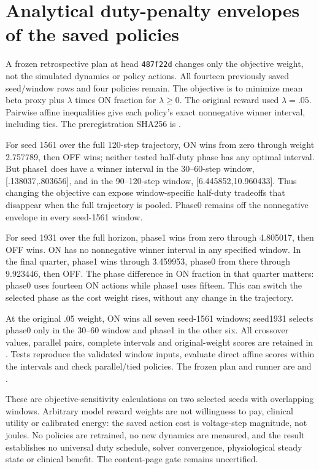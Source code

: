\section{Analytical duty-penalty envelopes of the saved policies}
A frozen retrospective plan at head \texttt{487f22d} changes only the objective weight, not the simulated dynamics or policy actions. All fourteen previously saved seed/window rows and four policies remain. The objective is to minimize mean beta proxy plus $\lambda$ times ON fraction for $\lambda\geq0$. The original reward used $\lambda=.05$. Pairwise affine inequalities give each policy's exact nonnegative winner interval, including ties. The preregistration SHA256 is .

For seed 1561 over the full 120-step trajectory, ON wins from zero through weight 2.757789, then OFF wins; neither tested half-duty phase has any optimal interval. But phase1 does have a winner interval in the 30--60-step window, [.138037,.803656], and in the 90--120-step window, [6.445852,10.960433]. Thus changing the objective can expose window-specific half-duty tradeoffs that disappear when the full trajectory is pooled. Phase0 remains off the nonnegative envelope in every seed-1561 window.

For seed 1931 over the full horizon, phase1 wins from zero through 4.805017, then OFF wins. ON has no nonnegative winner interval in any specified window. In the final quarter, phase1 wins through 3.459953, phase0 from there through 9.923446, then OFF. The phase difference in ON fraction in that quarter matters: phase0 uses fourteen ON actions while phase1 uses fifteen. This can switch the selected phase as the cost weight rises, without any change in the trajectory.

At the original .05 weight, ON wins all seven seed-1561 windows; seed1931 selects phase0 only in the 30--60 window and phase1 in the other six. All crossover values, parallel pairs, complete intervals and original-weight scores are retained in . Tests reproduce the validated window inputs, evaluate direct affine scores within the intervals and check parallel/tied policies. The frozen plan and runner are  and .

These are objective-sensitivity calculations on two selected seeds with overlapping windows. Arbitrary model reward weights are not willingness to pay, clinical utility or calibrated energy: the saved action cost is voltage-step magnitude, not joules. No policies are retrained, no new dynamics are measured, and the result establishes no universal duty schedule, solver convergence, physiological steady state or clinical benefit. The content-page gate remains uncertified.



